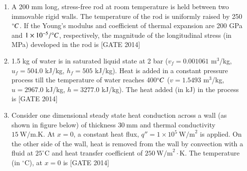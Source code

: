 \documentclass[journal,12pt,onecolumn]{IEEEtran}
\theoremstyle{remark}
\begin{document}
\begin{enumerate}
    \item A 200 mm long, stress-free rod at room temperature is held between two immovable rigid walls. The temperature of the rod is uniformly raised by 250$\degree C$. If the Young's modulus and coefficient of thermal expansion are 200 GPa and $1 \times 10^{-5}/ \degree C$, respectively, the magnitude of the longitudinal stress (in MPa) developed in the rod is \underline{\hspace{2cm}}\hfill{[GATE 2014]}
  \\
  
\item 1.5 kg of water is in saturated liquid state at 2 bar ($v_f = 0.001061$ m$^3$/kg, $u_f = 504.0$ kJ/kg, $h_f = 505$ kJ/kg). Heat is added in a constant pressure process till the temperature of water reaches 400$\degree C$ ($v = 1.5493$ m$^3$/kg, $u = 2967.0$ kJ/kg, $h = 3277.0$ kJ/kg). The heat added (in kJ) in the process is \underline{\hspace{2cm}}\hfill{[GATE 2014]}
 \\
    
 \item Consider one dimensional steady state heat conduction across a wall (as shown in figure below) of thickness $30 \ \text{mm}$ and thermal conductivity $15 \ \text{W/m.K}$. At $x = 0$, a constant heat flux, $q'' = 1 \times 10^5 \ \text{W/m}^2$ is applied. On the other side of the wall, heat is removed from the wall by convection with a fluid at $25^\circ \text{C}$ and heat transfer coefficient of $250 \ \text{W/m}^2\cdot\text{K}$. The temperature (in $^\circ \text{C}$), at $x = 0$ is \underline{\hspace{2cm}}\hfill{[GATE 2014]}

\begin{center}
\end{center}
\end{enumerate}
\end{document}
